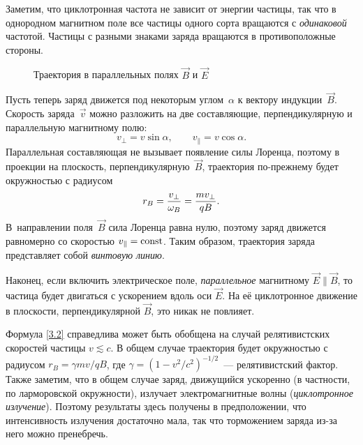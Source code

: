 Заметим, что циклотронная частота не зависит от энергии частицы, так
что в однородном магнитном поле все частицы одного сорта вращаются с
\emph{одинаковой} частотой. Частицы с разными знаками заряда вращаются в
противоположные стороны.

\begin{wrapfigure}{o}{0.25\textwidth}
\centering
 \caption{Траектория в параллельных полях $\vec{B}$ и $\vec{E}$}
\end{wrapfigure}

Пусть теперь заряд движется под некоторым углом~$\alpha$ к вектору
индукции~$\vec{B}$. Скорость заряда~$\vec{v}$ можно разложить
на две составляющие, перпендикулярную и параллельную магнитному полю:
\begin{equation*}
    v_{\perp}=v\sin\alpha,\qquad v_{\parallel}=v\cos\alpha.
\end{equation*}
Параллельная составляющая не вызывает появление силы Лоренца, поэтому
в проекции на плоскость, перпендикулярную~$\vec{B}$,
траектория по-прежнему будет окружностью с радиусом
\begin{equation}
    \eqmark{3.4}
    r_B = \frac{v_{\perp}}{\omega_B} = \frac{m v_{\perp}}{qB}.
\end{equation}
В~направлении поля~$\vec{B}$ сила Лоренца равна нулю, поэтому заряд движется
равномерно со скоростью $v_{\parallel}=\mathrm{const}$.
Таким образом, траектория заряда представляет собой \emph{винтовую линию}.

Наконец, если включить электрическое поле, \emph{параллельное}
магнитному $\vec{E}\parallel\vec{B}$, то частица будет двигаться с ускорением
вдоль оси $\vec{E}$. На её циклотронное движение в плоскости, перпендикулярной
$\vec{B}$, это никак не повлияет.

\begin{lab:note}
Формула \eqref{3.2} справедлива может быть обобщена на случай релятивистских скоростей
частицы $v\lesssim c$. В общем случае траектория будет окружностью с радиусом
$r_B = \gamma m v/qB$, где $\gamma = (1-v^2/c^2)^{-1/2}$~--- релятивистский фактор.
Также заметим, что в общем случае заряд, движущийся ускоренно (в частности,
по ларморовской окружности), излучает электромагнитные волны
(\emph{циклотронное излучение}). Поэтому результаты здесь получены в
предположении, что интенсивность излучения достаточно мала,
так что торможением заряда из-за него можно пренебречь.
\end{lab:note}



